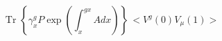 \begin{equation}  \label{basicamp}
\mbox{Tr }\left\{ \gamma^g_x P \exp\left( \int_x^{g x} A dx \right) \right\} \,
< V^g(0) V_{\mu}(1) >
\end{equation}

